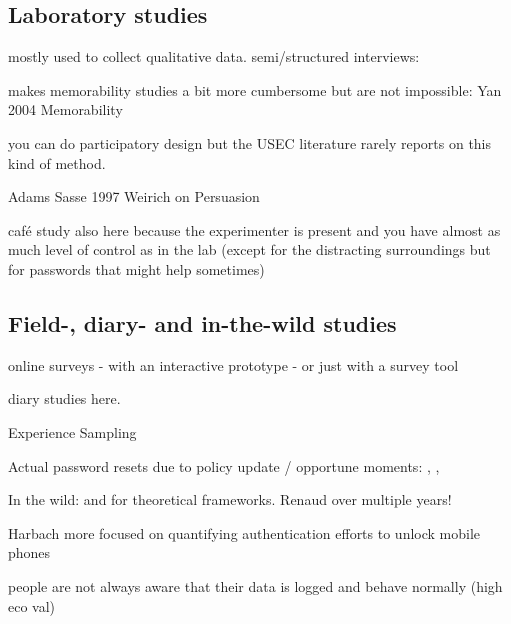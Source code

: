 \subsection{Laboratory studies}
mostly used to collect qualitative data.
semi/structured interviews: \cite{Stobert2014PasswordLifeCycle}

makes memorability studies a bit more cumbersome but are not impossible:
Yan 2004 Memorability \cite{Yan2004PasswordMemorabilitySecurity}


you can do participatory design \cite{Kuhn1993ParticipatoryDesign} but the USEC literature rarely reports on this kind of method.

Adams Sasse 1997 \cite{Adams1997MakingPWsSecureAndUsable}
Weirich on Persuasion \cite{Weirich2001PrettyGoodPersuasion, Weirich2005PersuasivePasswordSecurity}

café study also here because the experimenter is present and you have almost as much level of control as in the lab (except for the distracting surroundings but for passwords that might help sometimes)
\cite{VonZezschwitz2013SurvivalShortest}

\subsection{Field-, diary- and in-the-wild studies}

online surveys 
- with an interactive prototype 
- or just with a survey tool




diary studies here.  \cite{Hayashi2011DiaryStudyPWs}

Experience Sampling \cite{Consolvo2003ESM} 

Actual password resets due to policy update / opportune moments: \cite{Fahl2013EcologicalValidityPasswordStudy}, \cite{Mazurek2013Measuring}, \cite{Renaud2017LessonsLearnedNudges}

In the wild: \cite{Chamberlain2012ResearchInTheWild} and \cite{Henze2013EmpiricalResearchUbiquitous} for theoretical frameworks.
Renaud \cite{Renaud2017LessonsLearnedNudges} over multiple years!

Harbach more focused on quantifying authentication efforts to unlock mobile phones \cite{Harbach2016HardLockLife} 

people are not always aware that their data is logged and behave normally (high eco val)

